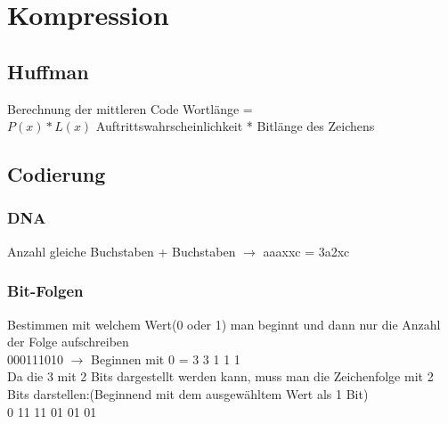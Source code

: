 
\section{Kompression}


\subsection{Huffman}
Berechnung der mittleren Code Wortlänge =\\ \colorbox{lightlightgrey}{$P(x)*L(x)$} Auftrittswahrscheinlichkeit * Bitlänge des Zeichens


\subsection{Codierung}


\subsubsection{DNA}
Anzahl gleiche Buchstaben + Buchstaben $\rightarrow$ aaaxxc = 3a2xc


\subsubsection{Bit-Folgen}
Bestimmen mit welchem Wert(0 oder 1) man beginnt und dann nur die Anzahl der Folge aufschreiben\\
000111010 $\rightarrow$ Beginnen mit 0 = 3 3 1 1 1\\Da die 3 mit 2 Bits dargestellt werden kann, muss man die Zeichenfolge mit 2 Bits darstellen:(Beginnend mit dem ausgewähltem Wert als 1 Bit)\\
0 11 11 01 01 01




\vfill
$$
\columnbreak